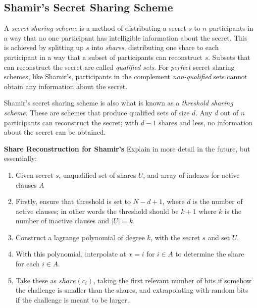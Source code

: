 \subsection{Shamir's Secret Sharing Scheme}
A \textit{secret sharing scheme} is a method of distributing a secret $s$ to $n$ participants in a way that no one participant has intelligible information about the secret. This is achieved by splitting up $s$ into \textit{shares}, distributing one share to each participant in a way that a subset of participants can reconstruct $s$. Subsets that can reconstruct the secret are called \textit{qualified sets}. For \textit{perfect} secret sharing schemes, like Shamir's, participants in the complement \textit{non-qualified} sets cannot obtain any information about the secret.

Shamir's secret sharing scheme \cite{DBLP:journals/cacm/Shamir79} is also what is known as a \textit{threshold sharing scheme}. These are schemes that produce  qualified sets of size $d$. Any $d$ out of $n$ participants can reconstruct the secret; with $d-1$ shares and less, no  information about the secret can be obtained. 

\textbf{Share Reconstruction for Shamir's}
Explain in more detail in the future, but essentially:
\begin{enumerate}
    \item Given secret $s$, unqualified set of shares $U$, and array of indexes for active clauses $A$
    \item Firstly, ensure that threshold is set to $N - d + 1$, where $d$ is the number of active clauses; in other words the threshold should be $k + 1$ where $k$ is the number of inactive clauses and $|U| = k$. 
    \item Construct a lagrange polynomial of degree $k$, with the secret $s$ and set $U$. 
    \item With this polynomial, interpolate at $x = i$ for $i \in A$ to determine the share for each $i \in A$. 
    \item Take these as $share(c_i)$, taking the first relevant number of bits if somehow the challenge is smaller than the shares, and extrapolating with random bits if the challenge is meant to be larger.
\end{enumerate}